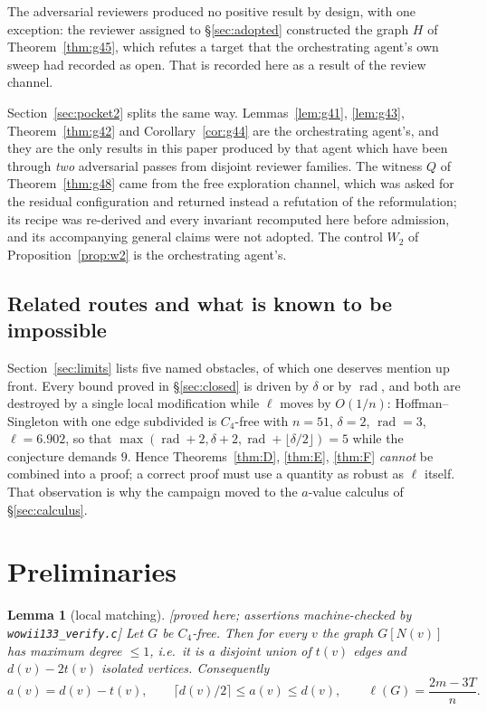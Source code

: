 \documentclass[11pt]{article}
\theoremstyle{plain}
\newtheorem{lemma}[theorem]{Lemma}
\theoremstyle{definition}
\theoremstyle{remark}
\numberwithin{equation}{section}
\newcommand{\rad}{\operatorname{rad}}
\newcommand{\statusbox}[1]{{\small\sloppy\textsf{[#1]}}}
\newcommand{\PRV}[1]{\statusbox{proved here; assertions machine-checked by \texttt{#1}}}
\begin{document}
The adversarial reviewers produced no positive result by design, with one exception: the
reviewer assigned to \S\ref{sec:adopted} constructed the graph $H$ of
Theorem~\ref{thm:g45}, which refutes a target that the orchestrating agent's own sweep had
recorded as open. That is recorded here as a result of the review channel.

Section~\ref{sec:pocket2} splits the same way. Lemmas~\ref{lem:g41}, \ref{lem:g43},
Theorem~\ref{thm:g42} and Corollary~\ref{cor:g44} are the orchestrating agent's, and they
are the only results in this paper produced by that agent which have been through
\emph{two} adversarial passes from disjoint reviewer families. The witness $Q$ of
Theorem~\ref{thm:g48} came from the free exploration channel, which was asked for the
residual configuration and returned instead a refutation of the reformulation; its recipe was
re-derived and every invariant recomputed here before admission, and its accompanying general
claims were not adopted. The control $W_2$ of Proposition~\ref{prop:w2} is the orchestrating
agent's.

\subsection{Related routes and what is known to be impossible}

Section~\ref{sec:limits} lists five named obstacles, of which one deserves mention up front.
Every bound proved in \S\ref{sec:closed} is driven by $\delta$ or by $\rad$, and both are
destroyed by a single local modification while $\ell$ moves by $O(1/n)$: Hoffman--Singleton
with one edge subdivided is $C_4$-free with $n = 51$, $\delta = 2$, $\rad = 3$,
$\ell = 6.902$, so that $\max(\rad + 2, \delta + 2, \rad + \lfloor \delta/2\rfloor) = 5$
while the conjecture demands $9$. Hence Theorems~\ref{thm:D}, \ref{thm:E}, \ref{thm:F}
\emph{cannot} be combined into a proof; a correct proof must use a quantity as robust as
$\ell$ itself. That observation is why the campaign moved to the $a$-value calculus of
\S\ref{sec:calculus}.

\section{Preliminaries}\label{sec:prelim}

\begin{lemma}[local matching]\label{lem:matching}
\PRV{wowii133\_verify.c}
Let $G$ be $C_4$-free. Then for every $v$ the graph $G[N(v)]$ has maximum degree $\le 1$,
i.e.\ it is a disjoint union of $t(v)$ edges and $d(v) - 2t(v)$ isolated vertices.
Consequently
\[
  a(v) = d(v) - t(v), \qquad \lceil d(v)/2\rceil \le a(v) \le d(v), \qquad
  \ell(G) = \frac{2m - 3T}{n}.
\]
\end{lemma}
\end{document}
